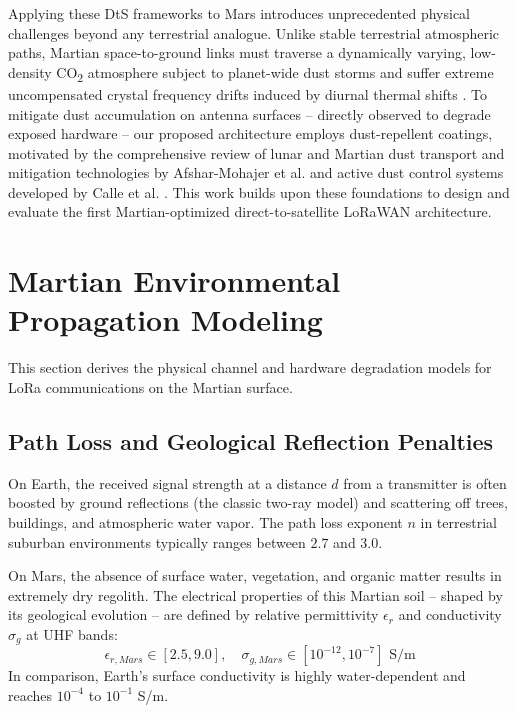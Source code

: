 \documentclass[journal,10pt,doublecolumn]{IEEEtran}
\begin{document}
Applying these DtS frameworks to Mars introduces unprecedented physical challenges beyond any terrestrial analogue. Unlike stable terrestrial atmospheric paths, Martian space-to-ground links must traverse a dynamically varying, low-density CO\textsubscript{2} atmosphere subject to planet-wide dust storms \cite{haberle1986dust} and suffer extreme uncompensated crystal frequency drifts induced by diurnal thermal shifts \cite{bor2016lora}. To mitigate dust accumulation on antenna surfaces -- directly observed to degrade exposed hardware \cite{landis2000dust} -- our proposed architecture employs dust-repellent coatings, motivated by the comprehensive review of lunar and Martian dust transport and mitigation technologies by Afshar-Mohajer et al. \cite{afshar2015review} and active dust control systems developed by Calle et al. \cite{calle2011active}. This work builds upon these foundations to design and evaluate the first Martian-optimized direct-to-satellite LoRaWAN architecture.

\section{Martian Environmental Propagation Modeling}
\label{sec:modeling}
This section derives the physical channel and hardware degradation models for LoRa communications on the Martian surface.

\subsection{Path Loss and Geological Reflection Penalties}
On Earth, the received signal strength at a distance $d$ from a transmitter is often boosted by ground reflections (the classic two-ray model) and scattering off trees, buildings, and atmospheric water vapor. The path loss exponent $n$ in terrestrial suburban environments typically ranges between $2.7$ and $3.0$. 

On Mars, the absence of surface water, vegetation, and organic matter results in extremely dry regolith. The electrical properties of this Martian soil -- shaped by its geological evolution \cite{carr2010mars} -- are defined by relative permittivity $\epsilon_r$ and conductivity $\sigma_{g}$ at UHF bands:
\begin{equation}
    \epsilon_{r, Mars} \in [2.5, 9.0], \quad \sigma_{g, Mars} \in [10^{-12}, 10^{-7}] \text{ S/m}
\end{equation}
In comparison, Earth's surface conductivity is highly water-dependent and reaches $10^{-4}$ to $10^{-1}$ S/m. 
\end{document}
